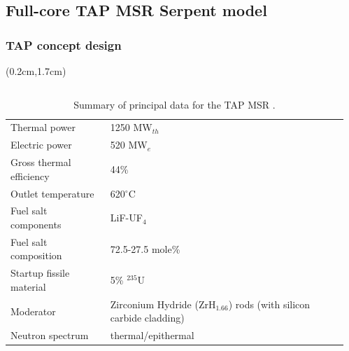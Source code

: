 \subsection{Full-core TAP MSR Serpent model}


\begin{frame}
\frametitle{TAP concept design}

\begin{textblock*}{12.5cm}(0.2cm,1.7cm) %
	
	\begin{columns}
		\column[t]{6cm}
			\vspace{+5mm}
	\begin{table}[h!]
		\fontsize{7}{10}\selectfont
	\caption{Summary of principal data for the \gls{TAP} \gls{MSR} 
		\cite{transatomic_power_corporation_technical_2016, 
			betzler_assessment_2017}. }
		\vspace{-2mm}
	\begin{tabularx}{\textwidth}{ X  X }
		\hline
		Thermal power				           		& 1250 MW$_{th}  $       
		\\ 
		Electric power		                		& 520 MW$_e  $ 			 
		\\ 
		Gross thermal efficiency        			& 44\%     				 
		\\  
		Outlet temperature							& 620$^{\circ}$C         
		\\ 
		Fuel salt components                   & LiF-UF$_4$				 \\  
		Fuel salt composition                  & 72.5-27.5 mole\%			 
		\\  
		Startup fissile material                     & 5\% 
		$^{235}$U          	 \\
		Moderator                              & Zirconium Hydride 
		(ZrH$_{1.66}$) rods (with silicon carbide cladding) \\
		Neutron spectrum						& 
		thermal/epithermal                 \\
		\hline
	\end{tabularx}
	\label{tab:tap_tab}
	\end{table}
		

\end{columns}
\end{textblock*}
\end{frame}
